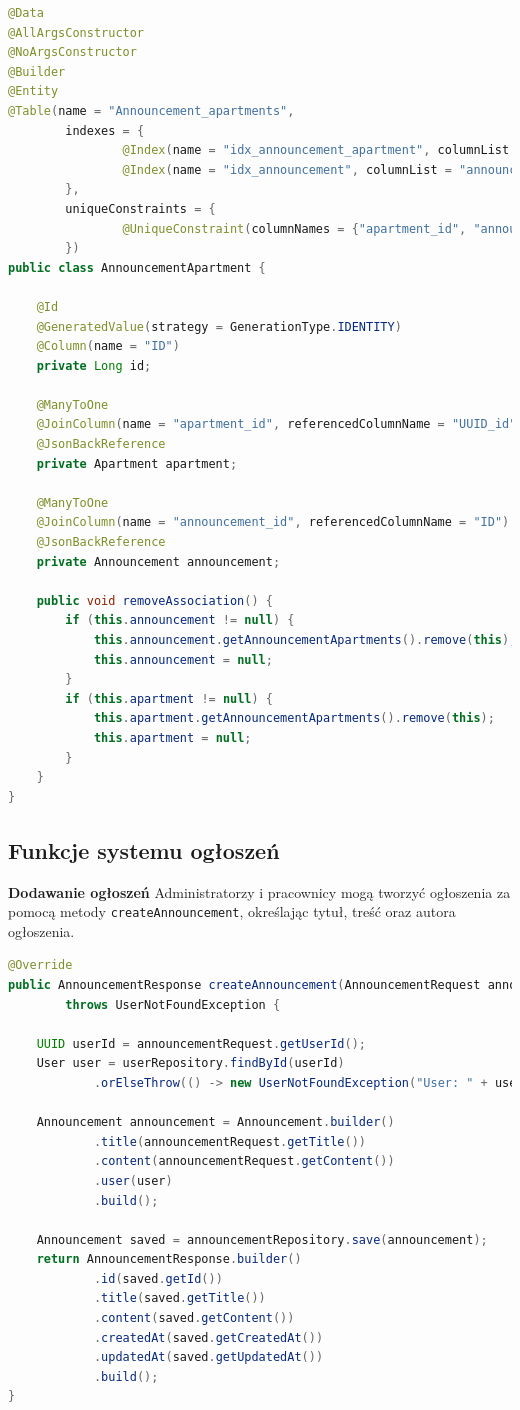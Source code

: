 \begin{lstlisting}[language=Java, style=JavaStyle, caption=Encja \texttt{AnnouncementApartment}]
@Data
@AllArgsConstructor
@NoArgsConstructor
@Builder
@Entity
@Table(name = "Announcement_apartments",
        indexes = {
                @Index(name = "idx_announcement_apartment", columnList = "apartment_id"),
                @Index(name = "idx_announcement", columnList = "announcement_id")
        },
        uniqueConstraints = {
                @UniqueConstraint(columnNames = {"apartment_id", "announcement_id"})
        })
public class AnnouncementApartment {

    @Id
    @GeneratedValue(strategy = GenerationType.IDENTITY)
    @Column(name = "ID")
    private Long id;

    @ManyToOne
    @JoinColumn(name = "apartment_id", referencedColumnName = "UUID_id")
    @JsonBackReference
    private Apartment apartment;

    @ManyToOne
    @JoinColumn(name = "announcement_id", referencedColumnName = "ID")
    @JsonBackReference
    private Announcement announcement;

    public void removeAssociation() {
        if (this.announcement != null) {
            this.announcement.getAnnouncementApartments().remove(this);
            this.announcement = null;
        }
        if (this.apartment != null) {
            this.apartment.getAnnouncementApartments().remove(this);
            this.apartment = null;
        }
    }
}
\end{lstlisting}

\subsection{Funkcje systemu ogłoszeń}

\noindent \textbf{Dodawanie ogłoszeń}\newline
Administratorzy i pracownicy mogą tworzyć ogłoszenia za pomocą metody \texttt{createAnnouncement}, określając tytuł, treść oraz autora ogłoszenia.

\begin{lstlisting}[language=Java, style=JavaStyle, caption=Dodawanie ogłoszenia.]
@Override
public AnnouncementResponse createAnnouncement(AnnouncementRequest announcementRequest) 
        throws UserNotFoundException {

    UUID userId = announcementRequest.getUserId();
    User user = userRepository.findById(userId)
            .orElseThrow(() -> new UserNotFoundException("User: " + userId + " not found"));

    Announcement announcement = Announcement.builder()
            .title(announcementRequest.getTitle())
            .content(announcementRequest.getContent())
            .user(user)
            .build();

    Announcement saved = announcementRepository.save(announcement);
    return AnnouncementResponse.builder()
            .id(saved.getId())
            .title(saved.getTitle())
            .content(saved.getContent())
            .createdAt(saved.getCreatedAt())
            .updatedAt(saved.getUpdatedAt())
            .build();
}
\end{lstlisting}

